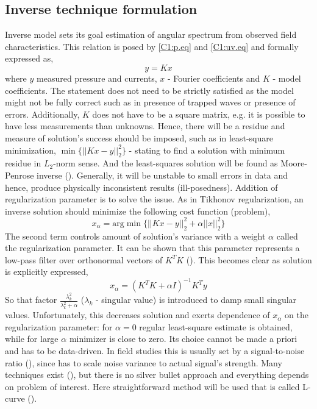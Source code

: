\subsection{Inverse technique formulation}
Inverse model sets its goal estimation of angular spectrum from observed field characteristics. This relation is posed by \eqref{C1:p.eq} and \eqref{C1:uv.eq} and formally expressed as,
\begin{equation}
y = K x
\end{equation}
where $y$ measured pressure and currents, $x$ - Fourier coefficients and $K$ - model coefficients. The statement does not need to be strictly satisfied as the model might not be fully correct such as in presence of trapped waves or presence of errors. Additionally, $K$ does not have to be a square matrix, e.g. it is possible to have less measurements than unknowns. Hence, there will be a residue and measure of solution's success should be imposed, such as in least-square minimization, $\min \{ ||K x - y||^2_2 \}$ - stating to find a solution with minimum residue in $L_2$-norm sense. And the least-squares solution  will be found as Moore-Penrose inverse (\cite{bennett1992inverse}). Generally, it will be unstable to small errors in data and hence, produce physically inconsistent results (ill-posedness). Addition of regularization parameter is to solve the issue. As in Tikhonov regularization, an inverse solution should minimize the following cost function (problem),
\begin{equation}
\label{C1:Tikh_prob}
x_\alpha = \text{arg}\min\{||K x - y||^2_2 + \alpha ||x||^2_2\}
\end{equation}
The second term controls amount of solution's variance with a weight $\alpha$ called the regularization parameter. It can be shown that this parameter represents a low-pass filter over orthonormal vectors of $K^TK$ (\cite{williams2001regularization}). This becomes clear as solution is explicitly expressed,
\begin{equation}
x_{\alpha} = (K^T K + \alpha I)^{-1} K^T y
\end{equation}
So that factor $\frac{\lambda_k^2}{\lambda_k^2 + \alpha}$ ($\lambda_k$ - singular value) is introduced to damp small singular values. Unfortunately, this decreases solution and exerts dependence of $x_{\alpha}$ on the regularization parameter: for $\alpha = 0$ regular least-square estimate is obtained, while for large $\alpha$ minimizer is close to zero. Its choice cannot be made a priori and has to be data-driven. In field studies this is usually set by a signal-to-noise ratio (\cite{munk2009ocean}), since has to scale noise variance to actual signal's strength. Many techniques exist (\cite{williams2001regularization}), but there is no silver bullet approach and everything depends on problem of interest. Here straightforward method will be used that is called L-curve (\cite{hansen1993use}).\\
